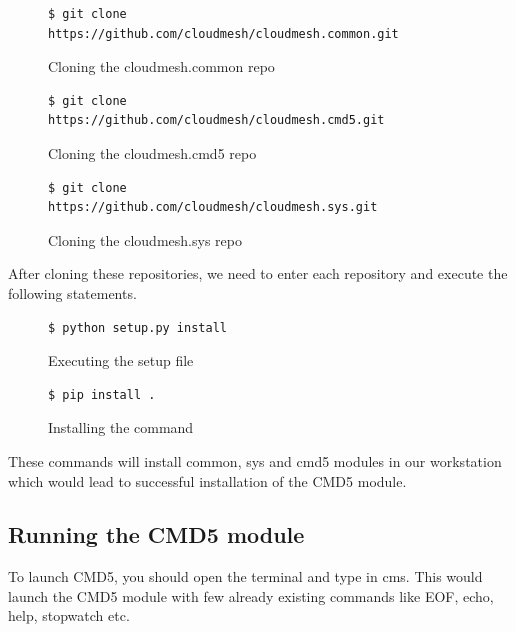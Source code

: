 \documentclass[9pt,twocolumn,twoside]{../../styles/osajnl}
\begin{document}
{\begin{figure}[H]
\begin{verbatim}
$ git clone
https://github.com/cloudmesh/cloudmesh.common.git
\end{verbatim}
\caption{Cloning the cloudmesh.common repo}
\label{Cloning the cloudmesh.common repo}
\end{figure}

\begin{figure}[H]
\begin{verbatim}
$ git clone
https://github.com/cloudmesh/cloudmesh.cmd5.git
\end{verbatim}
\caption{Cloning the cloudmesh.cmd5 repo}
\label{Cloning the cloudmesh.cmd5 repo}
\end{figure}

\begin{figure}[H]
\begin{verbatim}
$ git clone
https://github.com/cloudmesh/cloudmesh.sys.git
\end{verbatim}
\caption{Cloning the cloudmesh.sys repo}
\label{Cloning the cloudmesh.sys repo}
\end{figure}

\noindent
After cloning these repositories, we need to enter each repository and
execute the following statements.
\newline

\begin{figure}[H]
\begin{verbatim}
$ python setup.py install
\end{verbatim}
\caption{Executing the setup file}
\label{Executing the setup file}
\end{figure}

\begin{figure}[H]
\begin{verbatim}
$ pip install .
\end{verbatim}
\caption{Installing the command}
\label{Installing the command}
\end{figure}

\noindent
These commands will install common, sys and cmd5 modules in our
workstation which would lead to successful installation of the CMD5
module.

\subsection{Running the CMD5 module}
To launch CMD5, you should open the terminal and type in cms. This
would launch the CMD5 module with few already existing commands like
EOF, echo, help, stopwatch etc.

}
\end{document}
